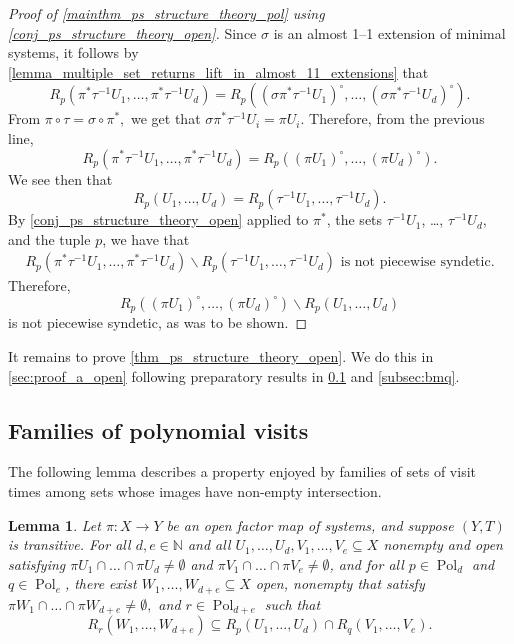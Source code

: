 \documentclass{article}
\theoremstyle{plain}
\newtheorem{lemma}[Theorem]{Lemma}
\theoremstyle{claim}
\theoremstyle{definition}
\theoremstyle{plain}
\theoremstyle{plain}
\newcommand{\N}{\mathbb{N}}
\newcommand{\Pol}{\operatorname{Pol}}
\renewcommand{\setminus}{\backslash}
\newcommand{\1}{\boldsymbol{1}}
\begin{document}
\begin{proof}[Proof of \cref{mainthm_ps_structure_theory_pol} using \cref{conj_ps_structure_theory_open}]
    
    Since $\sigma$ is an almost 1--1 extension of minimal systems, it follows by \cref{lemma_multiple_set_returns_lift_in_almost_11_extensions} that
    \[
        R_p(\pi^* \tau^{-1}U_1, \ldots, \pi^* \tau^{-1}U_d) = R_p((\sigma \pi^* \tau^{-1}U_1)^\circ, \ldots, (\sigma \pi^* \tau^{-1}U_d)^\circ).
    \]
    From $\pi \circ \tau = \sigma \circ \pi^*,$ we get that $\sigma \pi^* \tau^{-1}U_i = \pi U_i$.  
    Therefore, from the previous line,
    \[
        R_p(\pi^* \tau^{-1}U_1, \ldots, \pi^* \tau^{-1}U_d) = R_p((\pi U_1)^\circ, \ldots, (\pi U_d)^\circ).
    \]
    We see then that
    \[
        R_p(U_1, \ldots, U_d) = R_p(\tau^{-1}U_1, \ldots, \tau^{-1}U_d).
    \]
    By \cref{conj_ps_structure_theory_open} applied to $\pi^*$, the sets $\tau^{-1}U_1$, \dots, $\tau^{-1}U_d$, and the tuple $p$, we have that
    \begin{align}
    \label{eqn_applying_ps_structure_to_shadow_v2}
        R_p(\pi^* \tau^{-1}U_1, \ldots, \pi^* \tau^{-1}U_d) \setminus R_p(\tau^{-1}U_1, \ldots, \tau^{-1}U_d) \text{ is not piecewise syndetic.}
    \end{align}
    Therefore,
    \[
        R_p((\pi U_1)^\circ, \ldots, (\pi U_d)^\circ) \setminus R_p(U_1, \ldots, U_d)
    \]
    is not piecewise syndetic, as was to be shown.
\end{proof}



It remains to prove \cref{thm_ps_structure_theory_open}. We do this in \cref{sec:proof_a_open} following preparatory results in \cref{subsec:poly_visit_families} and \cref{subsec:bmq}.

\subsection{Families of polynomial visits}
\label{subsec:poly_visit_families}



The following lemma describes a property enjoyed by families of sets of visit times among sets whose images have non-empty intersection.

\begin{lemma}
\label{lemma_special_sets_of_returns_form_a_filterpol}
    Let $\pi: X \to Y$ be an open factor map of systems, and suppose $(Y,T)$ is transitive. For all $d, e \in \N$ and all $U_1,\ldots, U_d, V_1,\ldots, V_e \subseteq X$ nonempty and open satisfying $\pi U_1\cap\ldots\cap \pi U_d \neq \emptyset$ and $\pi V_1\cap\ldots\cap \pi V_e \neq \emptyset$, and for all $p \in\Pol_d$ and $q \in \Pol_e$, there exist $W_1, \ldots, W_{d+e} \subseteq X$ open, nonempty that satisfy $\pi W_1\cap\ldots\cap \pi W_{d+e} \neq \emptyset,$ and $r \in \Pol_{d+e}$ such that
    \[
        R_r(W_1,\ldots,W_{d+e}) \subseteq R_p(U_1,\ldots,U_d) \cap R_q(V_1,\ldots,V_e).
    \]
\end{lemma}
\end{document}
